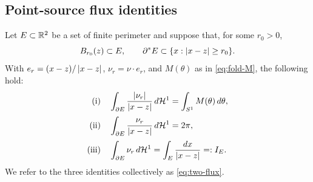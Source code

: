 \subsection{Point-source flux identities}

\begin{lemma}\label{lem:two-flux}
Let $E\subset\mathbb{R}^2$ be a set of finite perimeter and suppose that, for some
$r_0>0$,
\[
   B_{r_0}(z)\subset E,\qquad
   \partial^* E\subset\{x:\left\lvert x-z\right\rvert\ge r_0\}.
\]
With $e_r=(x-z)/\left\lvert x-z\right\rvert$, $\nu_r=\nu\cdot e_r$, and
$M(\theta)$ as in \eqref{eq:fold-M}, the following hold:
\begin{subequations}\label{eq:two-flux}
\begin{align}
   \textup{(i)}\quad
   &\int_{\partial E}\frac{\left\lvert\nu_r\right\rvert}{\left\lvert x-z\right\rvert}\,d\mathcal{H}^1
   =\int_{S^1}M(\theta)\,d\theta,
   \label{eq:two-flux-i}\\[2pt]
   \textup{(ii)}\quad
   &\int_{\partial E}\frac{\nu_r}{\left\lvert x-z\right\rvert}\,d\mathcal{H}^1=2\pi,
   \label{eq:two-flux-ii}\\[2pt]
   \textup{(iii)}\quad
   &\int_{\partial E}\nu_r\,d\mathcal{H}^1
   =\int_E\frac{dx}{\left\lvert x-z\right\rvert}=:I_E .
   \label{eq:two-flux-iii}
\end{align}
\end{subequations}
We refer to the three identities collectively as \eqref{eq:two-flux}.
\end{lemma}

